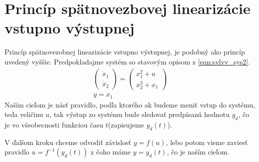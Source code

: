     \section{Princíp spätnovezbovej linearizácie vstupno výstupnej}
    Princíp spätnovezobnej linearizácie vstupno výstupnej, je podobný ako princíp uvedený vyššie. Predpokladajme systém so stavovým opisom z \cref{eqn:svlvv_sys2}.
    \begin{equation}
        \begin{gathered}
        \begin{pmatrix} 
            \dot{x}_1 \\ 
            \dot{x}_2
        \end{pmatrix} = \begin{pmatrix}
            x_1^2 + u \\
            x_2^3 + x_1
        \end{pmatrix}\\
            y = x_1
        \end{gathered}
        \label{eqn:svlvv_sys2}
    \end{equation}
    Naším cieľom je násť pravidlo, podľa ktorého ak budeme meniť vstup do systému, teda veličinu $u$, tak výstup zo systému bude sledovať predpísanú hodnotu $y_d$, čo je vo všeobecnosti funkciou času $t$(zapisujeme $y_d(t)$).

    V ďalšom kroku chceme odvodiť závislosť $y = f(u)$, lebo potom vieme zaviesť pravidlo $u = f^{-1}(y_d(t))$ z čoho máme $y = y_d(t)$, čo je naším cieľom.




